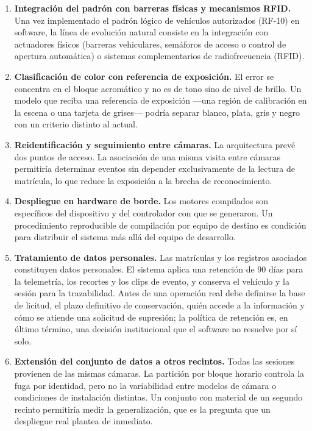 \begin{enumerate}
    \item \textbf{Integración del padrón con barreras físicas y mecanismos RFID.}
        Una vez implementado el padrón lógico de vehículos autorizados (RF-10) en
        software, la línea de evolución natural consiste en la integración con
        actuadores físicos (barreras vehiculares, semáforos de acceso o control
        de apertura automática) o sistemas complementarios de radiofrecuencia (RFID).

    \item \textbf{Clasificación de color con referencia de exposición.} El error
        se concentra en el bloque acromático y no es de tono sino de nivel de
        brillo. Un modelo que reciba una referencia de exposición ---una región
        de calibración en la escena o una tarjeta de grises--- podría separar
        blanco, plata, gris y negro con un criterio distinto al actual.

    \item \textbf{Reidentificación y seguimiento entre cámaras.} La arquitectura
        prevé dos puntos de acceso. La asociación de una misma visita entre
        cámaras permitiría determinar eventos sin depender exclusivamente de la
        lectura de matrícula, lo que reduce la exposición a la brecha de
        reconocimiento.

    \item \textbf{Despliegue en hardware de borde.} Los motores compilados son
        específicos del dispositivo y del controlador con que se generaron. Un
        procedimiento reproducible de compilación por equipo de destino es
        condición para distribuir el sistema más allá del equipo de desarrollo.

    \item \textbf{Tratamiento de datos personales.} Las matrículas y los registros
        asociados constituyen datos personales. El sistema aplica una retención de
        $90$ días para la telemetría, los recortes y los clips de evento, y conserva
        el vehículo y la sesión para la trazabilidad. Antes de una operación real debe definirse la
        base de licitud, el plazo definitivo de conservación, quién accede a la
        información y cómo se atiende una solicitud de supresión; la política de
        retención es, en último término, una decisión institucional que el software
        no resuelve por sí solo.

    \item \textbf{Extensión del conjunto de datos a otros recintos.} Todas las
        sesiones provienen de las mismas cámaras. La partición por bloque horario
        controla la fuga por identidad, pero no la variabilidad entre modelos de
        cámara o condiciones de instalación distintas. Un conjunto con material de
        un segundo recinto permitiría medir la generalización, que es la pregunta
        que un despliegue real plantea de inmediato.
\end{enumerate}

